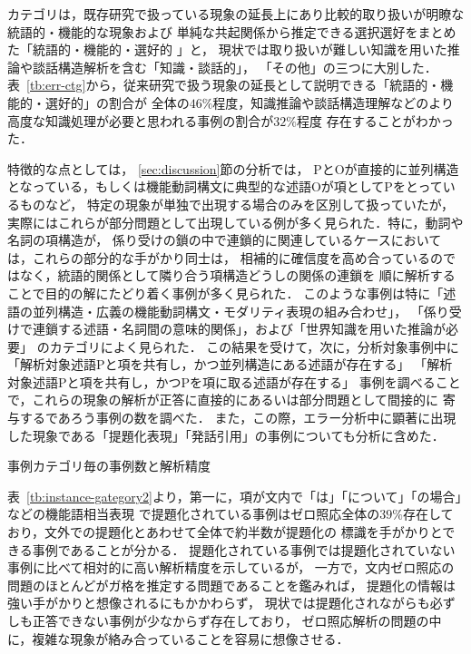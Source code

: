 \documentclass[japanese]{jnlp_1.4}
\begin{document}
カテゴリは，既存研究で扱っている現象の延長上にあり比較的取り扱いが明瞭な統語的・機能的な現象および
単純な共起関係から推定できる選択選好をまとめた「統語的・機能的・選好的 」と，
現状では取り扱いが難しい知識を用いた推論や談話構造解析を含む「知識・談話的」，
「その他」の三つに大別した．
表~\ref{tb:err-ctg}から，従来研究で扱う現象の延長として説明できる「統語的・機能的・選好的」の割合が
全体の$46\%$程度，知識推論や談話構造理解などのより高度な知識処理が必要と思われる事例の割合が$32\%$程度
存在することがわかった．

特徴的な点としては， \ref{sec:discussion}節の分析では，
PとOが直接的に並列構造となっている，もしくは機能動詞構文に典型的な述語Oが項としてPをとっているものなど，
特定の現象が単独で出現する場合のみを区別して扱っていたが，
実際にはこれらが部分問題として出現している例が多く見られた．特に，動詞や名詞の項構造が，
係り受けの鎖の中で連鎖的に関連しているケースにおいては，これらの部分的な手がかり同士は，
相補的に確信度を高め合っているのではなく，統語的関係として隣り合う項構造どうしの関係の連鎖を
順に解析することで目的の解にたどり着く事例が多く見られた．
このような事例は特に「述語の並列構造・広義の機能動詞構文・モダリティ表現の組み合わせ」，
「係り受けで連鎖する述語・名詞間の意味的関係」，および「世界知識を用いた推論が必要」
のカテゴリによく見られた．
この結果を受けて，次に，分析対象事例中に
「解析対象述語Pと項を共有し，かつ並列構造にある述語が存在する」
「解析対象述語Pと項を共有し，かつPを項に取る述語が存在する」
事例を調べることで，これらの現象の解析が正答に直接的にあるいは部分問題として間接的に
寄与するであろう事例の数を調べた．
また，この際，エラー分析中に顕著に出現した現象である「提題化表現」「発話引用」の事例についても分析に含めた．

\begin{table}[b]
\caption{事例カテゴリ毎の事例数と解析精度}
\label{tb:instance-gategory2}

\end{table}

表~\ref{tb:instance-gategory2}より，第一に，項が文内で「は」「について」「の場合」などの機能語相当表現
で提題化されている事例はゼロ照応全体の$39\%$存在しており，文外での提題化とあわせて全体で約半数が提題化の
標識を手がかりとできる事例であることが分かる．
提題化されている事例では提題化されていない事例に比べて相対的に高い解析精度を示しているが，
一方で，文内ゼロ照応の問題のほとんどがガ格を推定する問題であることを鑑みれば，
提題化の情報は強い手がかりと想像されるにもかかわらず， 
現状では提題化されながらも必ずしも正答できない事例が少なからず存在しており，
ゼロ照応解析の問題の中に，複雑な現象が絡み合っていることを容易に想像させる．
\end{document}
